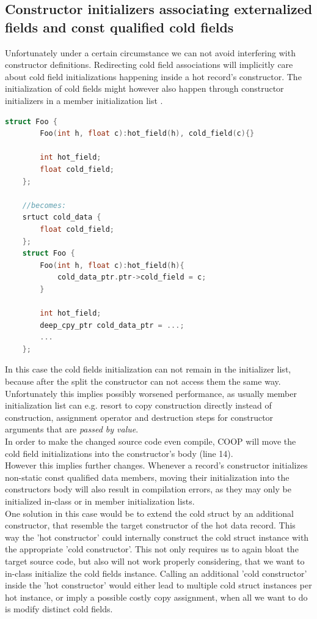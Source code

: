 \subsection{Constructor initializers associating externalized fields and const qualified cold fields}
Unfortunately under a certain circumstance we can not avoid interfering with constructor definitions. Redirecting cold field associations will implicitly care about cold field initializations happening inside a hot record's constructor. The initialization of cold fields might however also happen through constructor initializers in a member initialization list .
\begin{lstlisting}[language=C++, name={Simplified source transformations for problematic cold field initializations in initialization list.}, label={ctor_initializers}]
	struct Foo {
		Foo(int h, float c):hot_field(h), cold_field(c){}
	
		int hot_field;
		float cold_field;
	};
	
	//becomes:
	srtuct cold_data {
		float cold_field;
	};
	struct Foo {
		Foo(int h, float c):hot_field(h){
			cold_data_ptr.ptr->cold_field = c;
		}
	
		int hot_field;
		deep_cpy_ptr cold_data_ptr = ...;
		...
	};
\end{lstlisting}
In this case the cold fields initialization can not remain in the initializer list, because after the split the constructor can not access them the same way. Unfortunately this implies possibly worsened performance, as usually member initialization list can e.g. resort to copy construction directly instead of construction, assignment operator and destruction steps for constructor arguments that are \textit{passed by value}.\\
In order to make the changed source code even compile, COOP will move the cold field initializations into the constructor's body (line 14).\\
However this implies further changes. Whenever a record's constructor initializes non-static const qualified data members, moving their initialization into the constructors body will also result in compilation errors, as they may only be initialized in-class or in member initialization lists.\\
One solution in this case would be to extend the cold struct by an additional constructor, that resemble the target constructor of the hot data record. This way the 'hot constructor' could internally construct the cold struct instance with the appropriate 'cold constructor'. This not only requires us to again bloat the target source code, but also will not work properly considering, that we want to in-class initialize the cold fields instance. Calling an additional 'cold constructor' inside the 'hot constructor' would either lead to multiple cold struct instances per hot instance, or imply a possible costly copy assignment, when all we want to do is modify distinct cold fields.\\\\
